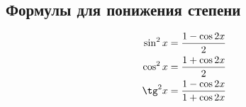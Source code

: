 \subsection*{Формулы для понижения степени}

\begin{align*}
  \sin^2 x  &= \frac{1 - \cos 2x}{2}\\
  \cos^2 x  &= \frac{1 + \cos 2x}{2}\\
  \tg^2 x  &= \frac{1 - \cos 2x}{1 + \cos 2x}
\end{align*}